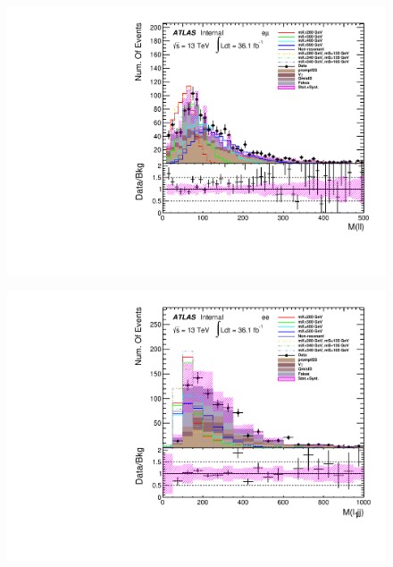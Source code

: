 \begin{figure}[h]
\begin{minipage}[t]{0.33\linewidth}
 \label{fig:dataMC_low_Njet_CR:m_ll_mumu.pdf}
 \end{minipage}
  \begin{minipage}[t]{0.33\linewidth}
 \centering
 \includegraphics[width=1.0\textwidth,angle=-90]{fig/dataMC_low_Njet_CR/m_ll_emu.pdf}
 \label{fig:dataMC_low_Njet_CR:m_ll_emu.pdf}
 \end{minipage}
\begin{minipage}[t]{0.33\linewidth}
 \centering
 \includegraphics[width=1.0\textwidth,angle=-90]{fig/dataMC_low_Njet_CR/m_l1jj_ee.pdf}\label{fig:dataMC_low_Njet_CR:m_l1jj_ee.pdf}
 \end{minipage}
 \begin{minipage}[t]{0.33\linewidth}
 \centering

\end{minipage}
\end{figure}
